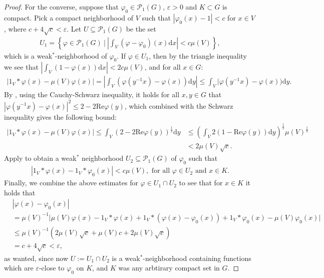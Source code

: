 \documentclass[10pt,twoside,openany,final]{memoir}
\theoremstyle{definition}
\theoremstyle{Break}
\renewcommand{\P}{\mathcal{P}}
\renewcommand{\d}{\mathrm{d}}
\renewcommand{\Re}{\mathrm{Re}}
\begin{document}
\begin{proof}
	For the converse, suppose that $\varphi_{0}\in \P_1(G)$, $\varepsilon >0$ and $K \subset G$ is compact. Pick a compact neighborhood of $V$ such that $|\varphi_0(x)-1|<c$ for $x \in V$, where $c +4\sqrt{c}<\varepsilon$. Let $U \subseteq \P_1(G)$ be the set
	\begin{align*}
		U_1=\left\{ \varphi \in \mathcal{P}_1(G) \ \big| \ \left|\int_V (\varphi-\varphi_0)(x) \d x \right| < c \mu(V) \right\},
	\end{align*}
	which is a weak$^*$-neighborhood of $\varphi_0$. If $\varphi \in U_1$, then by the triangle inequality we see that $\left|\int_V (1-\varphi(x)) \d x\right| < 2 c \mu(V)$, and for all $x \in G$:
	\begin{align*}
		| 1_V \ast \varphi(x) - \mu(V) \varphi(x) | = \left| \int_V (\varphi(y^{-1}x) - \varphi(x)) \d y\right| \leq \int _V |\varphi(y^{-1}x)-\varphi(x)) \d y.
	\end{align*}
	By , using the Cauchy-Schwarz inequality, it holds for all $x,y \in G$ that $|\varphi(y^{-1}x) - \varphi(x)|^2\leq 2-2 \mathrm{Re} \varphi(y)$, which combined with the Schwarz inequality gives the following bound:
	\begin{align*}
		\left| 1_V \ast \varphi(x) - \mu(V) \varphi(x) \right| \leq \int_V (2-2 \mathrm{Re}\varphi(y))^{\frac{1}{2}} \d y &\leq  \left( \int_V  2\left( 1-\Re \varphi(y) \right) \d y \right)^{\frac{1}{2}} \mu(V)^{\frac{1}{2}} \\
		&< 2 \mu(V) \sqrt{c}.
	\end{align*}
	Apply  to obtain a weak$^*$ neighborhood $U_2 \subseteq \P_{1}(G)$ of $\varphi_0$ such that 
\begin{align*}
	|1_V \ast \varphi(x)- 1_V \ast \varphi_0(x) | < c \mu(V), \text{ for all } \varphi \in U_2 \text{ and } x \in K.
\end{align*}
Finally, we combine the above estimates for $\varphi \in U_1 \cap U_2$ to see that for $x \in K$ it holds that
\begin{align*}
	&|\varphi(x)-\varphi_0(x)|\\&=\mu(V)^{-1} \big| \mu(V)\varphi(x)-1_V \ast\varphi(x)+1_V \ast(\varphi(x)-\varphi_0(x))+1_V\ast \varphi_0(x)-\mu(V)\varphi_0(x) \big|\\
	&\leq \mu(V)^{-1} (2 \mu(V) \sqrt{c}+\mu(V) c + 2 \mu(V) \sqrt{c})\\
	&=c+4\sqrt{c}<\varepsilon,
\end{align*}
as wanted, since now $U:=U_1 \cap U_2$ is a weak$^*$-neighborhood containing functions which are $\varepsilon$-close to $\varphi_0$ on $K$, and $K$ was any arbtirary compact set in $G$.
\end{proof}
\end{document}

